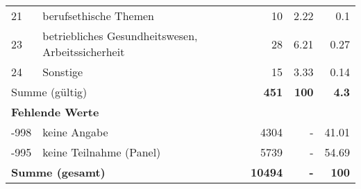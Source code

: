 \begin{longtable}{lXrrr}
        21 & \multicolumn{1}{X}{berufsethische Themen} & %
          \num{10} &
          \num[round-mode=places,round-precision=2]{2.22} &
          \num[round-mode=places,round-precision=2]{0.1} \\

        23 & \multicolumn{1}{X}{betriebliches Gesundheitswesen, Arbeitssicherheit} & %
          \num{28} &
          \num[round-mode=places,round-precision=2]{6.21} &
          \num[round-mode=places,round-precision=2]{0.27} \\

        24 & \multicolumn{1}{X}{Sonstige} & %
          \num{15} &
          \num[round-mode=places,round-precision=2]{3.33} &
          \num[round-mode=places,round-precision=2]{0.14} \\

     \midrule
     \multicolumn{2}{l}{Summe (gültig)} &
       \textbf{\num{451}} &
     \textbf{\num{100}} &
       \textbf{\num[round-mode=places,round-precision=2]{4.3}} \\
     \multicolumn{5}{l}{\textbf{Fehlende Werte}}\\
       -998 &
       keine Angabe &
         \num{4304} &
        - &
         \num[round-mode=places,round-precision=2]{41.01} \\
       -995 &
       keine Teilnahme (Panel) &
         \num{5739} &
        - &
         \num[round-mode=places,round-precision=2]{54.69} \\
     \midrule
     \multicolumn{2}{l}{\textbf{Summe (gesamt)}} &
          \textbf{\num{10494}} &
        \textbf{-} &
        \textbf{\num{100}} \\
     \bottomrule
     \end{longtable}
     
